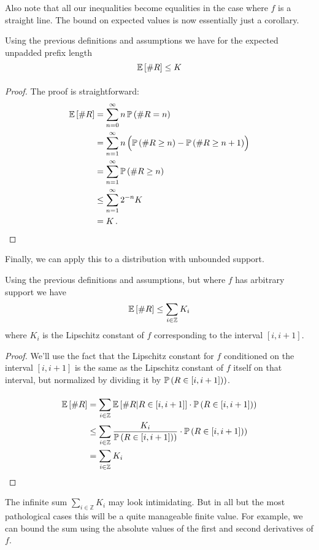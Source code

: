 Also note that all our inequalities become equalities in the case where $f$ is a straight line. The bound on expected values is now essentially just a corollary.

\begin{proposition}
	Using the previous definitions and assumptions we have for the expected unpadded prefix length 
	\[
	\underset{}{\mathbb{E}}\left[\#R\right] \leq K
	\]
\end{proposition}
\begin{proof}
The proof is straightforward:
\[
\begin{split}
	\underset{}{\mathbb{E}}\left[\#R\right] & =\sum_{n=0}^\infty n\,\underset{}{\mathbb{P}}\left(\#R=n\right)\\
			 & =\sum_{n=1}^\infty n\left(\underset{}{\mathbb{P}}\left(\#R\geq n\right) - \underset{}{\mathbb{P}}\left(\#R\geq n+1\right)\right)\\
			 & =\sum_{n=1}^\infty \underset{}{\mathbb{P}}\left(\#R\geq n\right)\\
			 & \leq\sum_{n=1}^\infty 2^{-n}K\\
			 & = K\,.
\end{split}
\]
\end{proof}

Finally, we can apply this to a distribution with unbounded support.

\begin{proposition}
	Using the previous definitions and assumptions, but where $f$ has arbitrary support we have
	\[
	\underset{}{\mathbb{E}}\left[\#R\right]\leq\sum_{i\in\mathbb{Z}} K_i
	\]
	where $K_i$ is the Lipschitz constant of $f$ corresponding to the interval $[i,i+1]$.
\end{proposition}
\begin{proof}
We'll use the fact that the Lipschitz constant for $f$ conditioned on the interval $[i,i+1]$ is the same as the Lipschitz constant of $f$ itself on that interval, but normalized by dividing it by $\underset{}{\mathbb{P}}\left(R\in[i,i+1]\right))$.

\[
\begin{split}
	\underset{}{\mathbb{E}}\left[\#R\right] & =\sum_{i\in\mathbb{Z}} \underset{}{\mathbb{E}}\left[\#R|R\in[i,i+1]\right]\cdot\underset{}{\mathbb{P}}\left(R\in[i,i+1]\right))\\
			   & \leq\sum_{i\in\mathbb{Z}} \frac{K_i}{\underset{}{\mathbb{P}}\left(R\in[i,i+1]\right))}\cdot\underset{}{\mathbb{P}}\left(R\in[i,i+1]\right))\\
			   & = \sum_{i\in\mathbb{Z}} K_i
\end{split}
\]
\end{proof}

The infinite sum $\sum_{i\in\mathbb{Z}} K_i$ may look intimidating. But in all but the most pathological cases this will be a quite manageable finite value. For example, we can bound the sum using the absolute values of the first and second derivatives of $f$.

